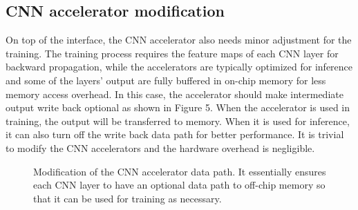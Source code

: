 \subsection{CNN accelerator modification}
  On top of the interface, the CNN accelerator also needs minor adjustment for the training. 
The training process requires the feature maps of each CNN layer for backward propagation, 
while the accelerators are typically optimized for inference and some of the layers’ output 
are fully buffered in on-chip memory for less memory access overhead. In this case, 
the accelerator should make intermediate output write back optional as shown in Figure 5. 
When the accelerator is used in training, the output will be transferred to memory. 
When it is used for inference, it can also turn off the write back data path for better performance. 
It is trivial to modify the CNN accelerators and the hardware overhead is negligible.

\begin{figure}
        \caption{Modification of the CNN accelerator data path. It essentially
ensures each CNN layer to have an optional data path to off-chip memory so that it
can be used for training as necessary.}
        \label{fig:change_of_accelerator}
        \vspace{-1em}
\end{figure}


